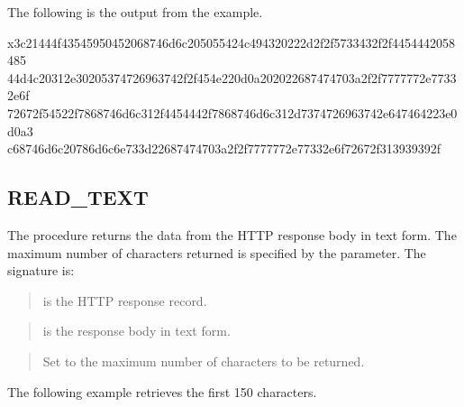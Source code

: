\documentclass[letterpaper,10pt,english,openany,oneside]{sphinxmanual}
\begin{document}
The following is the output from the example.

%
\begin{sphinxVerbatim}[commandchars=\\\{\}]
\PYGZbs{}x3c21444f43545950452068746d6c205055424c494320222d2f2f5733432f2f4454442058485
44d4c20312e30205374726963742f2f454e220d0a202022687474703a2f2f7777772e77332e6f
72672f54522f7868746d6c312f4454442f7868746d6c312d7374726963742e647464223e0d0a3
c68746d6c20786d6c6e733d22687474703a2f2f7777772e77332e6f72672f313939392f
\end{sphinxVerbatim}


\subsection{READ\_TEXT}
\label{\detokenize{utl_http:read-text}}
The  procedure returns the data from the HTTP response body in
text form. The maximum number of characters returned is specified by the
 parameter. The signature is:
\begin{quote}

\end{quote}


\begin{quote}

 is the HTTP response record.
\end{quote}

\begin{quote}

 is the response body in text form.
\end{quote}

\begin{quote}

Set  to the maximum number of characters to be returned.
\end{quote}


The following example retrieves the first 150 characters.
\end{document}
